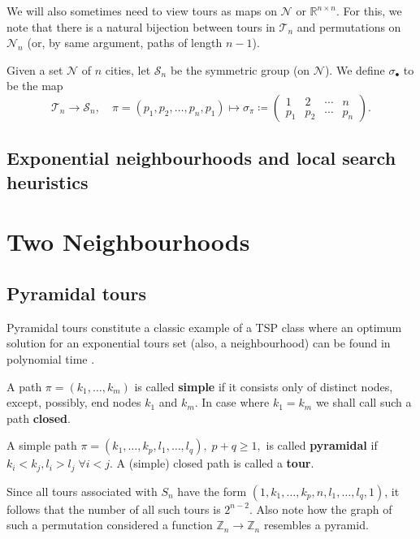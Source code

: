 \documentclass[index=totoc,bibliography=totoc]{scrartcl}
\newcommand{\annotation}[1]{\marginpar{\small\itshape\color{green}#1}}
\begin{document}
We will also sometimes need to view tours as maps on $\mathcal{N}$ or
$\mathbb{R}^{n \times n}$.  For this, we note that there is a natural
bijection between tours in $\mathcal{T}_n$ and permutations on
$\mathcal{N}_n$ (or, by same argument, paths of length $n-1$).
\begin{define}
Given a set $\mathcal{N}$ of $n$ cities, let $\mathcal{S}_n$ be the symmetric group (on $\mathcal{N}$).
We define $\sigma_{\bullet}$ to be the map
\[
  \mathcal{T}_n \to \mathcal{S}_n,
  \quad \pi = \left(p_1,p_2,\ldots,p_n,p_1\right) \mapsto
  \sigma_\pi \coloneqq
  \left( \begin{smallmatrix}
    1 & 2 & \cdots & n \\
    p_1 & p_2 & \cdots &  p_n
  \end{smallmatrix} \right).
\]
\end{define}

\subsection{Exponential neighbourhoods and local search heuristics}

\clearpage
\section{Two Neighbourhoods}

\subsection{Pyramidal tours}

\annotation{Who was first?}
Pyramidal tours constitute a classic example of a TSP class where an
optimum solution for an exponential tours set (also, a neighbourhood) can
be found in polynomial time \cite{bellman,gilmore}.

\begin{define}
  A path $\pi = \left( k_1, \ldots, k_m \right)$ is called {\bfseries simple}
  if it consists only of distinct nodes, except, possibly, end nodes $k_1$ and $k_m$.
  In case where $k_1 = k_m$ we shall call such a path {\bfseries closed}.
\end{define}
\begin{define}
  A simple path $\pi = \left( k_1, \ldots, k_p, l_1, \ldots, l_q \right), \; p+q \geq 1,$
  is called {\bfseries pyramidal} if
  $k_i < k_j, l_i > l_j \; \forall i < j$.
  A (simple) closed path is called a {\bfseries tour}.
\end{define}
\noindent
Since all tours associated with $S_n$ have the form $\left(1, k_1, \ldots,
k_p, n, l_1, \ldots, l_q, 1 \right)$, it follows that the number of all
such tours is $2^{n-2}$.  Also note how the graph of such a permutation
considered a function ${\mathbb Z}_n \rightarrow {\mathbb Z}_n$ resembles a
pyramid.
\end{document}
